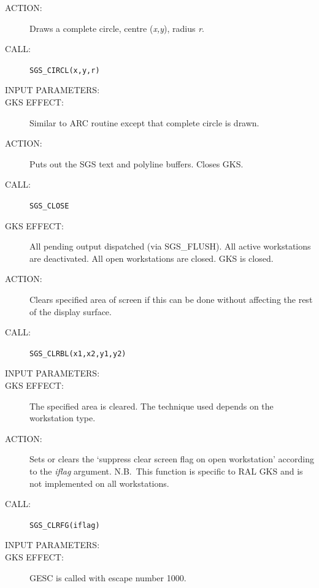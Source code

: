 \documentclass[11pt]{article}
\newcommand{\htmlref}[2]{#1}
\begin{document}
\begin{description}
\item [ACTION:]
Draws a complete circle, centre ({\em x,y}), radius {\em r}.
\item [CALL:]
{\tt SGS\_CIRCL(x,y,r)}
\item [INPUT PARAMETERS:]
\begin{params}
\end{params}
\item [GKS EFFECT:]
Similar to ARC routine except that complete circle is drawn.
\end{description}
\goodbreak

\begin{description}
\item [ACTION:]
Puts out the SGS text and polyline buffers.
Closes GKS.
\item [CALL:]
{\tt SGS\_CLOSE}
\item [GKS EFFECT:]
All pending output dispatched (via \htmlref{SGS\_FLUSH}{SGS_FLUSH}).
All active workstations are deactivated.
All open workstations are closed.
GKS is closed.
\end{description}
\goodbreak

\begin{description}
\item [ACTION:]
Clears specified area of screen if this can be done without affecting the rest
of the display surface.
\item [CALL:]
{\tt SGS\_CLRBL(x1,x2,y1,y2)}
\item [INPUT PARAMETERS:]
\begin{params}
\end{params}
\item [GKS EFFECT:]
The specified area is cleared.
The technique used depends on the workstation type.
\end{description}
\goodbreak

\begin{description}
\item [ACTION:]
Sets or clears the `suppress clear screen flag on open workstation' according
to the {\em iflag}\/ argument.
N.B.\ This function is specific to RAL GKS and is not implemented on all
workstations.
\item [CALL:]
{\tt SGS\_CLRFG(iflag)}
\item [INPUT PARAMETERS:]
\begin{params}
\end{params}
\item [GKS EFFECT:]
GESC is called with escape number 1000.
\end{description}
\goodbreak
\end{document}
